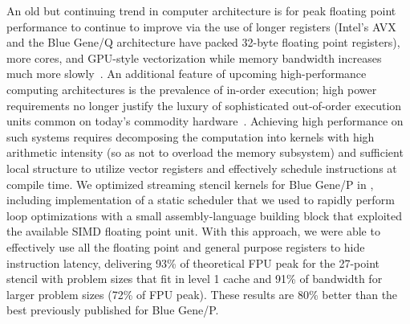 An old \citep{mccalpin2007stream} but continuing trend in computer architecture is for peak floating point performance to continue to improve via the use of longer registers (Intel's AVX and the Blue Gene/Q architecture have packed 32-byte floating point registers), more cores, and GPU-style vectorization while memory bandwidth increases much more slowly~\citep{keyes2011exaflop}.
An additional feature of upcoming high-performance computing architectures is the prevalence of in-order execution; high power requirements no longer justify the luxury of sophisticated out-of-order execution units common on today's commodity hardware~\citep{seiler2008larrabee,pham2006overview}.
Achieving high performance on such systems requires decomposing the computation into kernels with high arithmetic intensity (so as not to overload the memory subsystem) and sufficient local structure to utilize vector registers and effectively schedule instructions at compile time.
We optimized streaming stencil kernels for Blue Gene/P in \citet{malas2011streaming}, including implementation of a static scheduler that we used to rapidly perform loop optimizations with a small assembly-language building block that exploited the available SIMD floating point unit.
With this approach, we were able to effectively use all the floating point and general purpose registers to hide instruction latency, delivering 93\% of theoretical FPU peak for the 27-point stencil with problem sizes that fit in level 1 cache and 91\% of bandwidth for larger problem sizes (72\% of FPU peak).
These results are 80\% better than the best previously published for Blue Gene/P.

